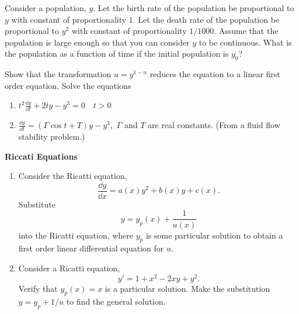 {\begin{Exercise}
\end{Exercise}





\begin{Exercise}
  \label{exercise population}
  Consider a population, $y$.  Let the birth rate of the population be 
  proportional to $y$ with constant of proportionality $1$.  Let the death
  rate of the population be proportional to $y^2$ with constant of 
  proportionality $1/1000$.  Assume that the population is large enough
  so that you can consider $y$ to be continuous.  What is the population as
  a function of time if the initial population is $y_0$?

\end{Exercise}




\begin{Exercise}
  \label{exercise t2dydt+2ty-y3=0}
  Show that the transformation $u = y^{1-n}$
  reduces the equation to a linear first order equation.  Solve the equations
  \begin{enumerate}
  \item
    $
    \displaystyle
    t^2 \frac{\dd y}{\dd t} + 2 t y - y^3 = 0 \quad t > 0
    $
  \item
    $
    \displaystyle
    \frac{\dd y}{\dd t} = \left( \Gamma \cos t + T \right) y - y^3,
    $
    $\Gamma$ and $T$ are real constants.  (From a fluid flow stability problem.)
  \end{enumerate}

\end{Exercise}





\begin{large}
  \noindent
  \textbf{Riccati Equations}
\end{large}






\begin{Exercise}
  \label{exercise riccati 2 methods}
  \begin{enumerate}
  \item
    Consider the Ricatti equation,
    \[
    \frac{\dd y}{\dd x} = a(x) y^2 + b(x) y + c(x).
    \]
    Substitute 
    \[
    y = y_p(x) + \frac{1}{u(x)}
    \]
    into the Ricatti equation, where $y_p$ is some particular solution to obtain
    a first order linear differential equation for $u$.
  \item
    Consider a Ricatti equation,
    \[
    y' = 1 + x^2 - 2 x y + y^2.
    \]
    Verify that $y_p(x) = x$ is a particular solution.
    Make the substitution $y = y_p + 1/u$ to find the general solution.


\end{enumerate}
\end{Exercise}}
